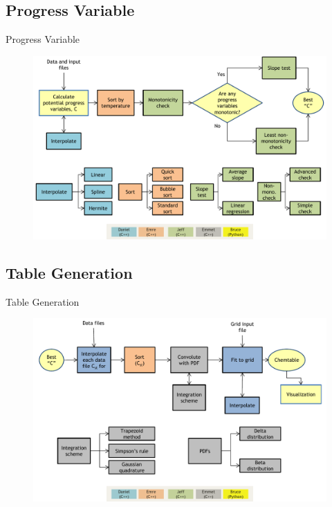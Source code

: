 \documentclass{beamer}
\begin{document}
\subsection{Progress Variable}
\begin{frame}{Progress Variable}
\begin{figure}
\includegraphics[width=\textwidth]{diagram_1_shortened_v3.pdf}
\end{figure}
\end{frame}

\subsection{Table Generation}
\begin{frame}{Table Generation}
\begin{figure}
\includegraphics[width=\textwidth]{diagram_2_shortened_v3.pdf}
\end{figure}
\end{frame}
\end{document}
